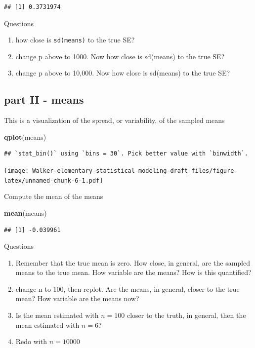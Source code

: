 \documentclass[]{book}
\newenvironment{Shaded}{\begin{snugshade}}{\end{snugshade}}
\newcommand{\KeywordTok}[1]{\textcolor[rgb]{0.13,0.29,0.53}{\textbf{#1}}}
\newcommand{\NormalTok}[1]{#1}
\providecommand{\tightlist}{%
  \setlength{\itemsep}{0pt}\setlength{\parskip}{0pt}}
\theoremstyle{definition}
\theoremstyle{definition}
\theoremstyle{definition}
\theoremstyle{remark}
\begin{document}
\begin{verbatim}
## [1] 0.3731974
\end{verbatim}

Questions

\begin{enumerate}
\def\labelenumi{\arabic{enumi}.}
\tightlist
\item
  how close is \texttt{sd(means)} to the true SE?
\item
  change p above to 1000. Now how close is sd(means) to the true SE?
\item
  change p above to 10,000. Now how close is sd(means) to the true SE?
\end{enumerate}

\subsection{part II - means}\label{part-ii---means}

This is a visualization of the spread, or variability, of the sampled
means

\begin{Shaded}
\begin{Highlighting}[]
\KeywordTok{qplot}\NormalTok{(means)}
\end{Highlighting}
\end{Shaded}

\begin{verbatim}
## `stat_bin()` using `bins = 30`. Pick better value with `binwidth`.
\end{verbatim}

\texttt{[image: Walker-elementary-statistical-modeling-draft\_files/figure-latex/unnamed-chunk-6-1.pdf]}

Compute the mean of the means

\begin{Shaded}
\begin{Highlighting}[]
\KeywordTok{mean}\NormalTok{(means)}
\end{Highlighting}
\end{Shaded}

\begin{verbatim}
## [1] -0.039961
\end{verbatim}

Questions

\begin{enumerate}
\def\labelenumi{\arabic{enumi}.}
\tightlist
\item
  Remember that the true mean is zero. How close, in general, are the
  sampled means to the true mean. How variable are the means? How is
  this quantified?
\item
  change n to 100, then replot. Are the means, in general, closer to the
  true mean? How variable are the means now?
\item
  Is the mean estimated with \(n=100\) closer to the truth, in general,
  then the mean estimated with \(n=6\)?
\item
  Redo with \(n=10000\)
\end{enumerate}
\end{document}
